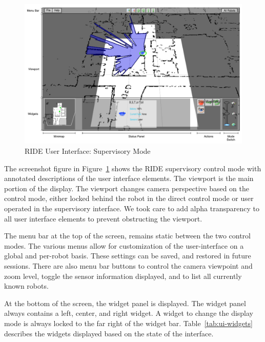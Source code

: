 \begin{figure}[ht]
\begin{center}
\includegraphics[width=6.10in]{images/ride-ui.pdf}
\caption{RIDE User Interface: Supervisory Mode\label{fig:ride-ui}}
\end{center}
\end{figure}

The screenshot figure in Figure~\ref{fig:ride-ui} shows the RIDE supervisory control mode with annotated descriptions of the user interface elements. The viewport is the main portion of the display. The viewport changes camera perspective based on the control mode, either locked behind the robot in the direct control mode or user operated in the supervisory interface. We took care to add alpha transparency to all user interface elements to prevent obstructing the viewport.

The menu bar at the top of the screen, remains static between the two control modes. The various menus allow for customization of the user-interface on a global and per-robot basis. These settings can be saved, and restored in future sessions. There are also menu bar buttons to control the camera viewpoint and zoom level, toggle the sensor information displayed, and to list all currently known robots.

At the bottom of the screen, the widget panel is displayed. The widget panel always contains a left, center, and right widget. A widget to change the display mode is always locked to the far right of the widget bar. Table~\ref{tab:ui-widgets} describes the widgets displayed based on the state of the interface.

